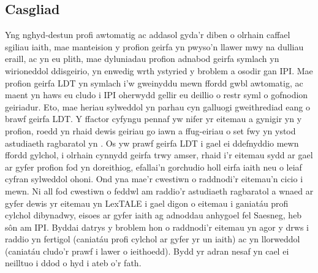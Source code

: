 \subsection{Casgliad}
Yng nghyd-destun profi awtomatig ac addasol gyda'r diben o olrhain caffael sgiliau iaith, mae manteision y profion geirfa yn pwyso'n llawer mwy na dulliau eraill, ac yn eu plith, mae dyluniadau profion adnabod geirfa symlach yn wirioneddol ddisgeirio, yn enwedig wrth ystyried y broblem a osodir gan IPI\@. Mae profion geirfa LDT yn symlach i'w gweinyddu mewn ffordd gwbl awtomatig, ac maent yn haws eu cludo i IPI oherwydd gellir eu deillio o restr syml o gofnodion geiriadur. Eto, mae heriau sylweddol yn parhau cyn galluogi gweithrediad eang o brawf geirfa LDT\@. Y ffactor cyfyngu pennaf yw nifer yr eitemau a gynigir yn y profion, roedd yn rhaid dewis geiriau go iawn a ffug-eiriau o set fwy yn ystod astudiaeth ragbaratol yn \cite{lemhofer_introducing_2012}. Os yw prawf geirfa LDT i gael ei ddefnyddio mewn ffordd gylchol, i olrhain cynnydd geirfa trwy amser, rhaid i'r eitemau sydd ar gael ar gyfer profion fod yn doreithiog, efallai'n gorchudio holl eirfa iaith neu o leiaf cyfran sylweddol ohoni. Ond yna mae'r cwestiwn o raddnodi'r eitemau'n cicio i mewn. Ni all fod cwestiwn o feddwl am raddio'r astudiaeth ragbaratol a wnaed ar gyfer dewis yr eitemau yn LexTALE i gael digon o eitemau i ganiatáu profi cylchol dibynadwy, eisoes ar gyfer iaith ag adnoddau anhygoel fel Saesneg, heb sôn am IPI\@. Byddai datrys y broblem hon o raddnodi'r eitemau yn agor y drws i raddio yn fertigol (caniatáu profi cylchol ar gyfer yr un iaith) ac yn llorweddol (caniatáu cludo'r prawf i lawer o ieithoedd). Bydd yr adran nesaf yn cael ei neilltuo i ddod o hyd i ateb o'r fath.

